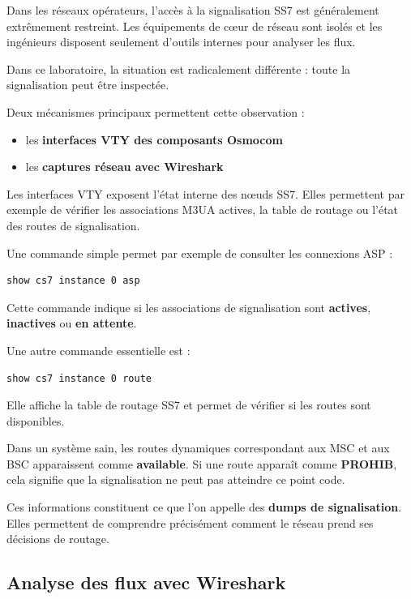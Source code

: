 \documentclass[
  french,
]{article}
\providecommand{\tightlist}{%
  \setlength{\itemsep}{0pt}\setlength{\parskip}{0pt}}
\begin{document}
Dans les réseaux opérateurs, l'accès à la signalisation SS7 est
généralement extrêmement restreint. Les équipements de cœur de réseau
sont isolés et les ingénieurs disposent seulement d'outils internes pour
analyser les flux.

Dans ce laboratoire, la situation est radicalement différente : toute la
signalisation peut être inspectée.

Deux mécanismes principaux permettent cette observation :

\begin{itemize}
\tightlist
\item
  les \textbf{interfaces VTY des composants Osmocom}
\item
  les \textbf{captures réseau avec Wireshark}
\end{itemize}

Les interfaces VTY exposent l'état interne des nœuds SS7. Elles
permettent par exemple de vérifier les associations M3UA actives, la
table de routage ou l'état des routes de signalisation.

Une commande simple permet par exemple de consulter les connexions ASP :

\begin{verbatim}
show cs7 instance 0 asp
\end{verbatim}

Cette commande indique si les associations de signalisation sont
\textbf{actives}, \textbf{inactives} ou \textbf{en attente}.

Une autre commande essentielle est :

\begin{verbatim}
show cs7 instance 0 route
\end{verbatim}

Elle affiche la table de routage SS7 et permet de vérifier si les routes
sont disponibles.

Dans un système sain, les routes dynamiques correspondant aux MSC et aux
BSC apparaissent comme \textbf{available}. Si une route apparaît comme
\textbf{PROHIB}, cela signifie que la signalisation ne peut pas
atteindre ce point code.

Ces informations constituent ce que l'on appelle des \textbf{dumps de
signalisation}. Elles permettent de comprendre précisément comment le
réseau prend ses décisions de routage.

\subsection{Analyse des flux avec
Wireshark}\label{analyse-des-flux-avec-wireshark}
\end{document}
